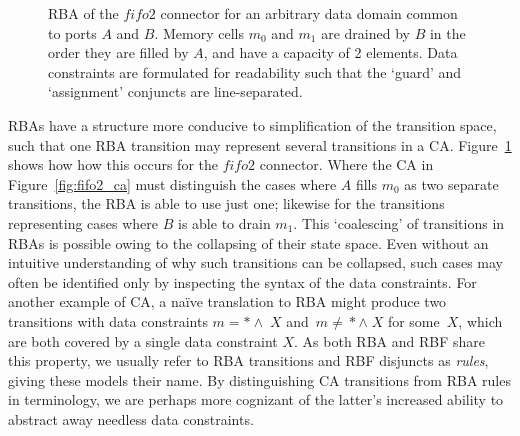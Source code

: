 \begin{figure}[ht]
	\centering
	\caption[RBA for fifo2 connector.]{RBA of the $fifo2$ connector for an arbitrary data domain common to ports $A$ and $B$. Memory cells $m_0$ and $m_1$ are drained by $B$ in the order they are filled by $A$, and have a capacity of 2 elements. Data constraints are formulated for readability such that the `guard' and `assignment' conjuncts are line-separated.}
	\label{fig:fifo2_rba}
\end{figure}



RBAs have a structure more conducive to simplification of the transition space, such that one RBA transition may represent several transitions in a CA. Figure~\ref{fig:fifo2_rba} shows how how this occurs for the $fifo2$ connector. Where the CA in Figure~\ref{fig:fifo2_ca} must distinguish the cases where $A$ fills $m_0$ as two separate transitions, the RBA is able to use just one; likewise for the transitions representing cases where $B$ is able to drain $m_1$. This `coalescing' of transitions in RBAs is possible owing to the collapsing of their state space. Even without an intuitive understanding of why such transitions can be collapsed, such cases may often be identified only by inspecting the syntax of the data constraints. For another example of CA, a na{\"i}ve translation to RBA might produce two transitions with data constraints $m=*\wedge{}\;X$ and~$m\neq{}*\wedge{}\;X$ for some~$X$, which are both covered by a single data constraint $X$. As both RBA and RBF share this property, we usually refer to RBA transitions and RBF disjuncts as \textit{rules}, giving these models their name. By distinguishing CA transitions from RBA rules in terminology, we are perhaps more cognizant of the latter's increased ability to abstract away needless data constraints. 

